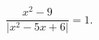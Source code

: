 \begin{ex}[type=equation]
	\begin{condition}
		$\dfrac{x^2 - 9}{\big | x^2 - 5x + 6\big|} = 1.$
	\end{condition}
\end{ex}